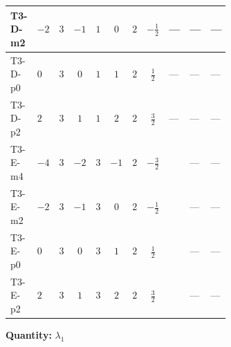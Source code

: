\documentclass[8pt]{article}
\begin{document}
\begin{landscape}
\begin{longtable}{@{}llcccccc >{\raggedright\arraybackslash}p{0.21\linewidth} >{\raggedright\arraybackslash}p{0.21\linewidth} >{\raggedright\arraybackslash}p{0.21\linewidth}@{}}
\midrule
T3-D-m2 & $-2$ & $3$ & $-1$ & $1$ & $0$ & $2$ & $-\frac{1}{2}$ & --- & --- & --- \\
\midrule
T3-D-p0 & $0$ & $3$ & $0$ & $1$ & $1$ & $2$ & $\frac{1}{2}$ & --- & --- & --- \\
\midrule
T3-D-p2 & $2$ & $3$ & $1$ & $1$ & $2$ & $2$ & $\frac{3}{2}$ & --- & --- & --- \\
\midrule
T3-E-m4 & $-4$ & $3$ & $-2$ & $3$ & $-1$ & $2$ & $-\frac{3}{2}$ & \scriptsize\adjustbox{max width=\linewidth}{$\begin{gathered} +3 {\lambda_{HS_2}^{(A)}}^2\end{gathered}$} & --- & --- \\
\midrule
T3-E-m2 & $-2$ & $3$ & $-1$ & $3$ & $0$ & $2$ & $-\frac{1}{2}$ & \scriptsize\adjustbox{max width=\linewidth}{$\begin{gathered} +3 {\lambda_{HS_2}^{(A)}}^2\end{gathered}$} & --- & --- \\
\midrule
T3-E-p0 & $0$ & $3$ & $0$ & $3$ & $1$ & $2$ & $\frac{1}{2}$ & \scriptsize\adjustbox{max width=\linewidth}{$\begin{gathered} +3 {\lambda_{HS_2}^{(A)}}^2\end{gathered}$} & --- & --- \\
\midrule
T3-E-p2 & $2$ & $3$ & $1$ & $3$ & $2$ & $2$ & $\frac{3}{2}$ & \scriptsize\adjustbox{max width=\linewidth}{$\begin{gathered} +3 {\lambda_{HS_2}^{(A)}}^2\end{gathered}$} & --- & --- \\
\midrule
\bottomrule
\end{longtable}
\clearpage
\noindent\textbf{Quantity: }$\lambda_1$\par\smallskip

\end{landscape}
\end{document}
